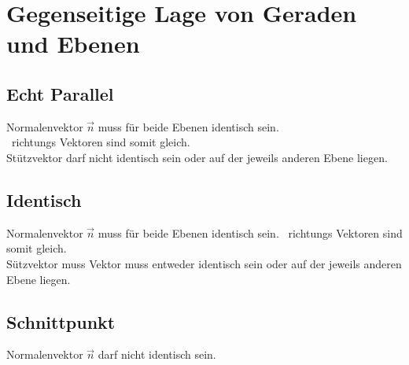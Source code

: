 
\section{Gegenseitige Lage von Geraden und Ebenen}
\subsection{Echt Parallel}
Normalenvektor $\vec{n}$ muss für beide Ebenen identisch sein. \\
\textrightarrow\ richtungs Vektoren sind somit gleich. \\
Stützvektor darf nicht identisch sein oder auf der jeweils anderen Ebene liegen.

\subsection{Identisch}
Normalenvektor $\vec{n}$ muss für beide Ebenen identisch sein.
\textrightarrow\ richtungs Vektoren sind somit gleich. \\
Sützvektor muss Vektor muss entweder identisch sein oder auf der jeweils anderen Ebene liegen.

\subsection{Schnittpunkt}
Normalenvektor $\vec{n}$ darf nicht identisch sein. 
